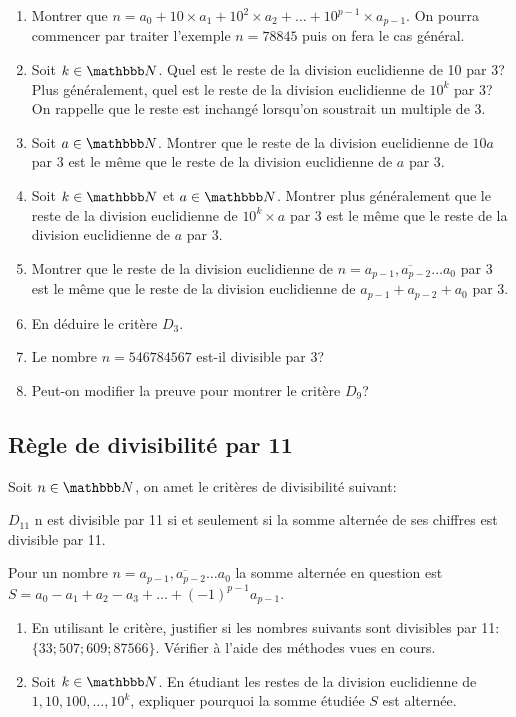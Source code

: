 \documentclass[a4paper,12pt, french, noSujetB]{article}
\begin{document}
\begin{enumerate}
	\item Montrer que $n=a_0 + 10\times a_1  +10^2\times a_2+\dots+10^{p-1}\times a_{p-1}$. On pourra commencer par traiter l'exemple $n=78845$ puis on fera le cas général.
	\item Soit $k\in\N$. Quel est le reste de la division euclidienne de 10 par 3? Plus généralement, quel est le reste de la division euclidienne de $10^k$ par 3? On rappelle que le reste est inchangé lorsqu'on soustrait un multiple de 3.
	\item Soit $a\in\N$. Montrer que le reste de la division euclidienne de $10a$ par 3 est le même que le reste de la division euclidienne de $a$ par 3.
	\item Soit $k\in\N$ et $a\in\N$. Montrer plus généralement que le reste de la division euclidienne de $10^k\times a$ par 3 est le même que le reste de la division euclidienne de $a$ par 3.
	\item Montrer que le reste de la division euclidienne de $n=\overline{a_{p-1},  a_{p-2} \dots a_0}$ par 3 est le même que le reste de la division euclidienne de $a_{p-1} +  a_{p-2} + a_0$ par 3.
	\item En déduire le critère $D_3$.
	\item Le nombre $n=546784567$ est-il divisible par 3?
	\item Peut-on modifier la preuve pour montrer le critère $D_9$?
\end{enumerate}

\vspace{-3mm}
\subsection*{Règle de divisibilité par 11 }
Soit $n\in\N$, on amet le critères de divisibilité suivant:

$D_{11}$ \og n est divisible par 11 si et seulement si la somme alternée de ses chiffres est divisible par 11.

Pour un nombre $n=\overline{a_{p-1},  a_{p-2} \dots a_0}$ la somme alternée en question est $S=a_0-a_1+a_2-a_3+\dots+(-1)^{p-1}a_{p-1}$.

\begin{enumerate}
	\item En utilisant le critère, justifier si les nombres suivants sont divisibles par 11: $\{33; 507; 609; 87566\}$. Vérifier à l'aide des méthodes vues en cours.
	\item Soit $k\in\N$. En étudiant les restes de la division euclidienne de $1, 10, 100, \dots, 10^k$, expliquer pourquoi la somme étudiée $S$ est alternée.
\end{enumerate}
\end{document}
